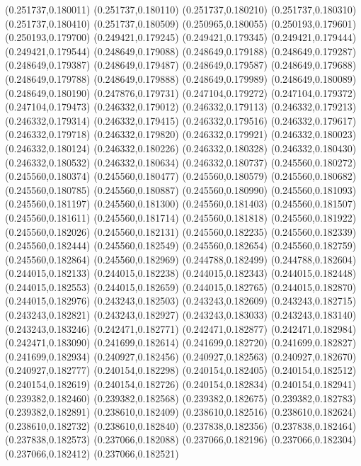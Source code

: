 (0.251737,0.180011)
(0.251737,0.180110)
(0.251737,0.180210)
(0.251737,0.180310)
(0.251737,0.180410)
(0.251737,0.180509)
(0.250965,0.180055)
(0.250193,0.179601)
(0.250193,0.179700)
(0.249421,0.179245)
(0.249421,0.179345)
(0.249421,0.179444)
(0.249421,0.179544)
(0.248649,0.179088)
(0.248649,0.179188)
(0.248649,0.179287)
(0.248649,0.179387)
(0.248649,0.179487)
(0.248649,0.179587)
(0.248649,0.179688)
(0.248649,0.179788)
(0.248649,0.179888)
(0.248649,0.179989)
(0.248649,0.180089)
(0.248649,0.180190)
(0.247876,0.179731)
(0.247104,0.179272)
(0.247104,0.179372)
(0.247104,0.179473)
(0.246332,0.179012)
(0.246332,0.179113)
(0.246332,0.179213)
(0.246332,0.179314)
(0.246332,0.179415)
(0.246332,0.179516)
(0.246332,0.179617)
(0.246332,0.179718)
(0.246332,0.179820)
(0.246332,0.179921)
(0.246332,0.180023)
(0.246332,0.180124)
(0.246332,0.180226)
(0.246332,0.180328)
(0.246332,0.180430)
(0.246332,0.180532)
(0.246332,0.180634)
(0.246332,0.180737)
(0.245560,0.180272)
(0.245560,0.180374)
(0.245560,0.180477)
(0.245560,0.180579)
(0.245560,0.180682)
(0.245560,0.180785)
(0.245560,0.180887)
(0.245560,0.180990)
(0.245560,0.181093)
(0.245560,0.181197)
(0.245560,0.181300)
(0.245560,0.181403)
(0.245560,0.181507)
(0.245560,0.181611)
(0.245560,0.181714)
(0.245560,0.181818)
(0.245560,0.181922)
(0.245560,0.182026)
(0.245560,0.182131)
(0.245560,0.182235)
(0.245560,0.182339)
(0.245560,0.182444)
(0.245560,0.182549)
(0.245560,0.182654)
(0.245560,0.182759)
(0.245560,0.182864)
(0.245560,0.182969)
(0.244788,0.182499)
(0.244788,0.182604)
(0.244015,0.182133)
(0.244015,0.182238)
(0.244015,0.182343)
(0.244015,0.182448)
(0.244015,0.182553)
(0.244015,0.182659)
(0.244015,0.182765)
(0.244015,0.182870)
(0.244015,0.182976)
(0.243243,0.182503)
(0.243243,0.182609)
(0.243243,0.182715)
(0.243243,0.182821)
(0.243243,0.182927)
(0.243243,0.183033)
(0.243243,0.183140)
(0.243243,0.183246)
(0.242471,0.182771)
(0.242471,0.182877)
(0.242471,0.182984)
(0.242471,0.183090)
(0.241699,0.182614)
(0.241699,0.182720)
(0.241699,0.182827)
(0.241699,0.182934)
(0.240927,0.182456)
(0.240927,0.182563)
(0.240927,0.182670)
(0.240927,0.182777)
(0.240154,0.182298)
(0.240154,0.182405)
(0.240154,0.182512)
(0.240154,0.182619)
(0.240154,0.182726)
(0.240154,0.182834)
(0.240154,0.182941)
(0.239382,0.182460)
(0.239382,0.182568)
(0.239382,0.182675)
(0.239382,0.182783)
(0.239382,0.182891)
(0.238610,0.182409)
(0.238610,0.182516)
(0.238610,0.182624)
(0.238610,0.182732)
(0.238610,0.182840)
(0.237838,0.182356)
(0.237838,0.182464)
(0.237838,0.182573)
(0.237066,0.182088)
(0.237066,0.182196)
(0.237066,0.182304)
(0.237066,0.182412)
(0.237066,0.182521)
